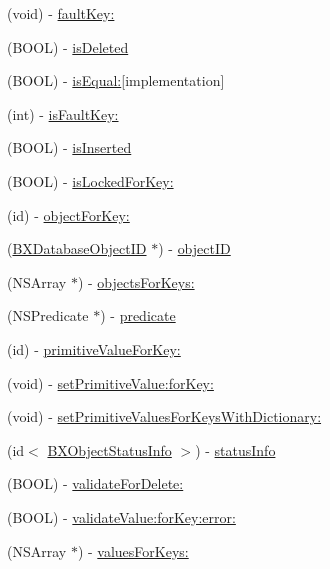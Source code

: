 \begin{DoxyCompactItemize}
\item 
(void) -\/ \hyperlink{interface_b_x_database_object_ae766a9251fdbd0922b31018205403476}{fault\+Key\+:}
\item 
(B\+O\+O\+L) -\/ \hyperlink{interface_b_x_database_object_a67f1cf0086f127d01033c1e8529ef7ab}{is\+Deleted}
\item 
(B\+O\+O\+L) -\/ \hyperlink{interface_b_x_database_object_ac3a11ada46b86e3476336e7a1f2e8c5d}{is\+Equal\+:}{\ttfamily  \mbox{[}implementation\mbox{]}}
\item 
(int) -\/ \hyperlink{interface_b_x_database_object_a9f500828e88ff9ed10e0f124987f5c1c}{is\+Fault\+Key\+:}
\item 
(B\+O\+O\+L) -\/ \hyperlink{interface_b_x_database_object_ab95e2fd29daf1ed8e1a816600718861d}{is\+Inserted}
\item 
(B\+O\+O\+L) -\/ \hyperlink{interface_b_x_database_object_aa366f2489aafa4d2783432d6b3012014}{is\+Locked\+For\+Key\+:}
\item 
(id) -\/ \hyperlink{interface_b_x_database_object_af3a31b0a842e890b508772c96f18bc89}{object\+For\+Key\+:}
\item 
(\hyperlink{interface_b_x_database_object_i_d}{B\+X\+Database\+Object\+I\+D} $\ast$) -\/ \hyperlink{interface_b_x_database_object_a84005bb56ea3b7be6edcfec01ad292f2}{object\+I\+D}
\item 
(N\+S\+Array $\ast$) -\/ \hyperlink{interface_b_x_database_object_a1c36b5b332a5f61be2e6080de8a933da}{objects\+For\+Keys\+:}
\item 
(N\+S\+Predicate $\ast$) -\/ \hyperlink{interface_b_x_database_object_ad5e110fe26d2dc26e2da4ac882a100d2}{predicate}
\item 
(id) -\/ \hyperlink{interface_b_x_database_object_a0576661b8930420dce5248584dfc1add}{primitive\+Value\+For\+Key\+:}
\item 
(void) -\/ \hyperlink{interface_b_x_database_object_ab4d3738a5d4bcd6fd89ffcb7fb6fe6e5}{set\+Primitive\+Value\+:for\+Key\+:}
\item 
(void) -\/ \hyperlink{interface_b_x_database_object_a02643433ee57009f9c316c040e086016}{set\+Primitive\+Values\+For\+Keys\+With\+Dictionary\+:}
\item 
(id$<$ \hyperlink{interface_b_x_object_status_info}{B\+X\+Object\+Status\+Info} $>$) -\/ \hyperlink{interface_b_x_database_object_a265a128ae31aff014eff278ec66ae1da}{status\+Info}
\item 
(B\+O\+O\+L) -\/ \hyperlink{interface_b_x_database_object_ade326897773ce523f74b3f3c9394da2b}{validate\+For\+Delete\+:}
\item 
(B\+O\+O\+L) -\/ \hyperlink{interface_b_x_database_object_a83a8a9a412b73e0ef13c7c59faa364d4}{validate\+Value\+:for\+Key\+:error\+:}
\item 
(N\+S\+Array $\ast$) -\/ \hyperlink{interface_b_x_database_object_a5e0891622abd6b9503e9477bc9cb1b17}{values\+For\+Keys\+:}
\end{DoxyCompactItemize}
